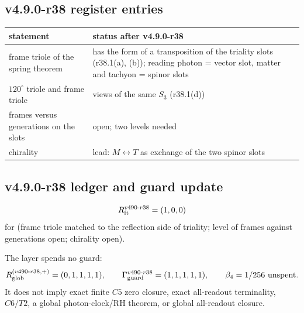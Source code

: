 \subsection*{v4.9.0-r38 register entries}
\label{subsec:v490-r38-register}

\begin{center}
\small
\begin{tabular}{@{}>{\raggedright\arraybackslash}p{}>{\raggedright\arraybackslash}p{}@{}}
\toprule
statement & status after v4.9.0-r38\\
\midrule
frame triole of the spring theorem & has the form of a transposition of the triality slots (r38.1(a), (b)); reading photon = vector slot, matter and tachyon = spinor slots\\
\(120^\circ\) triole and frame triole & views of the same \(S_3\) (r38.1(d))\\
frames versus generations on the slots & open; two levels needed\\
chirality & lead: \(M\leftrightarrow T\) as exchange of the two spinor slots\\
\bottomrule
\end{tabular}
\end{center}

\subsection*{v4.9.0-r38 ledger and guard update}
\label{subsec:v490-r38-ledger-guard}

\[
R_{\rm ft}^{v490\text{-}r38}=(1,0,0)
\]
for (frame triole matched to the reflection side of triality; level of frames against generations open; chirality open).

The layer spends no guard:
\[
R_{\rm glob}^{(v490\text{-}r38,+)}=(0,1,1,1,1),
\qquad
\Gamma_{\rm guard}^{v490\text{-}r38}=(1,1,1,1,1),
\qquad
\beta_4=1/256\ \text{unspent}.
\]
It does not imply exact finite \(C5\) zero closure, exact all-readout terminality,
\(C6/T2\), a global photon-clock/RH theorem, or global all-readout closure.
